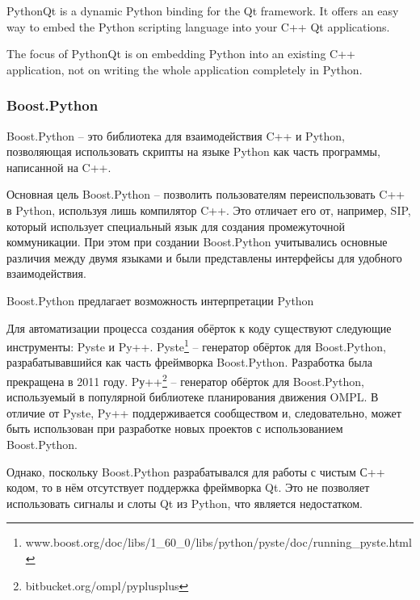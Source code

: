 \documentclass[14pt]{matmex-diploma-custom}
\begin{document}
PythonQt is a dynamic Python binding for the Qt framework. It offers an easy way to embed the Python scripting language into your C++ Qt applications.

The focus of PythonQt is on embedding Python into an existing C++ application, not on writing the whole application completely in Python.

\subsubsection{Boost.Python}
Boost.Python \cite{abrahams2003boost} -- это библиотека для взаимодействия C++ и Python, позволяющая использовать скрипты на языке Python как часть программы, написанной на C++. 

Основная цель Boost.Python -- позволить пользователям переиспользовать C++ в Python, используя лишь компилятор C++. Это отличает его от, например, SIP, который использует специальный язык для создания промежуточной коммуникации. При этом при создании Boost.Python учитывались основные различия между двумя языками и были представлены интерфейсы для удобного взаимодействия.

Boost.Python предлагает возможность интерпретации Python

Для автоматизации процесса создания обёрток к коду существуют следующие инструменты: Pyste и Py++. Pyste\footnote{www.boost.org/doc/libs/1\_60\_0/libs/python/pyste/doc/running\_pyste.html} -- генератор обёрток для Boost.Python, разрабатывавшийся как часть фреймворка Boost.Python. Разработка была прекращена в 2011 году. Pу++\footnote{bitbucket.org/ompl/pyplusplus} -- генератор обёрток для Boost.Python, используемый в популярной библиотеке планирования движения OMPL\cite{sucan2012theOMPL}. В отличие от Pyste, Py++ поддерживается сообществом и, следовательно, может быть использован при разработке новых проектов с использованием Boost.Python.


Однако, поскольку Boost.Python разрабатывался для работы с чистым С++ кодом, то в нём отсутствует поддержка фреймворка Qt. Это не позволяет использовать сигналы и слоты Qt из Python, что является недостатком. 

\end{document}
